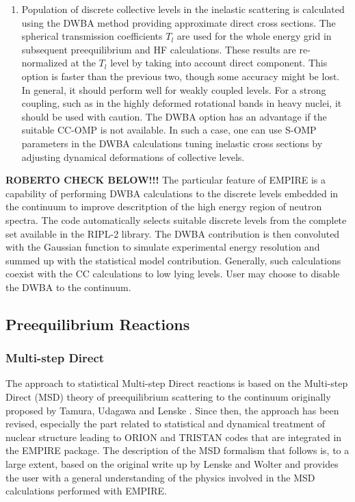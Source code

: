 \documentclass[twocolumn,amsmath,amssymb,10pt,groupedaddress,a4paper]{revtex4}
\begin{document}
\begin{enumerate}
\item Population of discrete collective levels in the inelastic
scattering is calculated using the DWBA method providing
approximate direct cross sections. The spherical transmission coefficients
$T_{l}$ are used for the whole energy grid in subsequent preequilibrium
and HF calculations. These results are re-normalized
at the $T_{l}$ level by taking into account direct component.
This option is faster than the previous two, though some accuracy might be lost. In general,
it should perform well for weakly coupled levels. For a strong coupling,
such as in the highly deformed rotational bands in heavy nuclei, it
should be used with caution. The DWBA option has an advantage
if the suitable CC-OMP is not available. In such a case, one can use
S-OMP parameters in the DWBA calculations tuning inelastic cross sections
by adjusting dynamical deformations of collective levels.
\end{enumerate}

\textbf{ROBERTO CHECK BELOW!!!}
The particular feature of EMPIRE is a capability of performing DWBA calculations to the
discrete levels embedded in the continuum to improve descritption of the high energy region
of neutron spectra. The code automatically selects suitable discrete levels from
the complete set available in the RIPL-2 library. The DWBA contribution is then convoluted
with the Gaussian function to simulate experimental energy resolution and summed up with the statistical model contribution. Generally, such calculations coexist with the CC calculations to low lying levels. User may choose to disable the DWBA to the continuum.

\subsection{Preequilibrium Reactions}

\subsubsection{Multi-step Direct\label{sec: MSD}}


The approach to statistical Multi-step Direct reactions
is based on the Multi-step Direct (MSD) theory of preequilibrium scattering
to the continuum originally proposed by Tamura, Udagawa and Lenske
\cite{TUL}. Since then, the approach has been revised, especially
the part related to statistical and dynamical treatment of nuclear
structure leading to ORION and TRISTAN codes that are integrated in
the EMPIRE package. The description of the MSD formalism that follows
is, to a large extent, based on the original write up by Lenske and Wolter and
provides the user with a general understanding of the physics involved
in the MSD calculations performed with EMPIRE.
\end{document}
